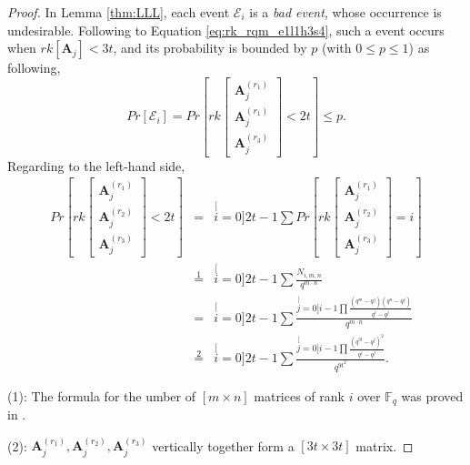 \begin{proof}
In Lemma \ref{thm:LLL}, each event $\mathcal{E}_{i}$ is a \textit{bad
event}, whose occurrence is undesirable. Following to Equation \ref{eq:rk_rqm_e1l1h3s4},
such a event occurs when $rk\left[\boldsymbol{A}_{j}\right]<3t$,
and its probability is bounded by $p$ (with $0\leq p\leq1$) as following,
\begin{equation}
Pr\left[\mathcal{E}_{i}\right]=Pr\left[rk\left[\begin{array}{c}
\boldsymbol{A}_{j}^{\left(r_{1}\right)}\\
\boldsymbol{A}_{j}^{\left(r_{1}\right)}\\
\boldsymbol{A}_{j}^{\left(r_{3}\right)}
\end{array}\right]<2t\right]\leq p.\label{eq:p_in_LLL}
\end{equation}
Regarding to the left-hand side,
\begin{eqnarray}
Pr\left[rk\left[\begin{array}{c}
\boldsymbol{A}_{j}^{\left(r_{1}\right)}\\
\boldsymbol{A}_{j}^{\left(r_{2}\right)}\\
\boldsymbol{A}_{j}^{\left(r_{3}\right)}
\end{array}\right]<2t\right] & = & \stackrel[i=0]{2t-1}{\mathop{\sum}}Pr\left[rk\left[\begin{array}{c}
\boldsymbol{A}_{j}^{\left(r_{1}\right)}\\
\boldsymbol{A}_{j}^{\left(r_{2}\right)}\\
\boldsymbol{A}_{j}^{\left(r_{3}\right)}
\end{array}\right]=i\right]\nonumber \\
 & \overset{1}{=} & \stackrel[i=0]{2t-1}{\mathop{\sum}}\frac{N_{i,m,n}}{q^{m\cdot n}}\nonumber \\
 & = & \stackrel[i=0]{2t-1}{\mathop{\sum}}\frac{\stackrel[j=0]{i-1}{\mathop{\prod}}\frac{\left(q^{m}-q^{j}\right)\left(q^{n}-q^{j}\right)}{q^{i}-q^{j}}}{q^{m\cdot n}}\nonumber \\
 & \overset{2}{=} & \stackrel[i=0]{2t-1}{\mathop{\sum}}\frac{\stackrel[j=0]{i-1}{\mathop{\prod}}\frac{\left(q^{3t}-q^{j}\right)^{2}}{q^{i}-q^{j}}}{q^{9t^{2}}}.\label{eq:p_eq_h3}
\end{eqnarray}

(1): The formula for the umber of $\left[m\times n\right]$ matrices
of rank $i$ over $\ensuremath{\mathbb{F}}_{q}$ was proved in \cite{Overbeck:2007}.

(2): $\boldsymbol{A}_{j}^{\left(r_{1}\right)},\boldsymbol{A}_{j}^{\left(r_{2}\right)},\boldsymbol{A}_{j}^{\left(r_{3}\right)}$
vertically together form a $\left[3t\times3t\right]$ matrix.


\end{proof}
